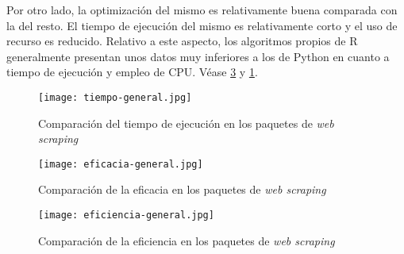 Por otro lado, la optimización del mismo es relativamente buena comparada con la del resto. El tiempo de
ejecución del mismo es relativamente corto y el uso de recurso es reducido. Relativo a este aspecto, los
algoritmos propios de R generalmente presentan unos datos muy inferiores a los de Python en cuanto a tiempo 
de ejecución y empleo de CPU. Véase \ref{img:comparacion de la eficiencia en los paquetes de web scraping} 
y \ref{img:comparacion del tiempo de ejecucion en los paquetes de web scraping}.

\begin{figure}[tphb]
    \centering
    \texttt{[image: tiempo-general.jpg]}
    \caption{Comparación del tiempo de ejecución en los paquetes de \emph{web scraping}}
    \label{img:comparacion del tiempo de ejecucion en los paquetes de web scraping}
\end{figure}

\begin{figure}[tphb]
    \centering
    \texttt{[image: eficacia-general.jpg]}
    \caption{Comparación de la eficacia en los paquetes de \emph{web scraping}}
    \label{img:comparacion de la eficacia en los paquetes de web scraping}
\end{figure}

\begin{figure}[tphb]
    \centering
    \texttt{[image: eficiencia-general.jpg]}
    \caption{Comparación de la eficiencia en los paquetes de \emph{web scraping}}
    \label{img:comparacion de la eficiencia en los paquetes de web scraping}
\end{figure}




